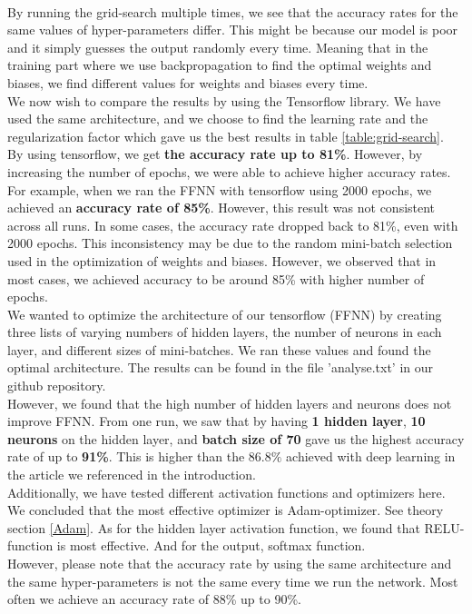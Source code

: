 \documentclass[reprint,english,notitlepage]{revtex4-1}  %
\begin{document}
\vspace{3mm}
\\
By running the grid-search multiple times, we see that the accuracy rates for the same values of hyper-parameters differ. This might be because our model is poor and it simply guesses the output randomly every time. Meaning that in the training part where we use backpropagation to find the optimal weights and biases, we find different values for weights and biases every time. 
\vspace{3mm}
\\
We now wish to compare the results by using the Tensorflow library. We have used the same architecture, and we choose to find the learning rate and the regularization factor which gave us the best results in table \ref{table:grid-search}. 
\vspace{3mm}
\\
By using tensorflow, we get \textbf{the accuracy rate up to 81\%}. However, by increasing the number of epochs, we were able to achieve higher accuracy rates. For example, when we ran the FFNN with tensorflow using 2000 epochs, we achieved an \textbf{accuracy rate of 85\%}. However, this result was not consistent across all runs. In some cases, the accuracy rate dropped back to 81\%, even with 2000 epochs. This inconsistency may be due to the random mini-batch selection used in the optimization of weights and biases. However, we observed that in most cases, we achieved accuracy to be around 85\% with higher number of epochs. 
\vspace{3mm}
\\
We wanted to optimize the architecture of our tensorflow (FFNN) by creating three lists of varying numbers of hidden layers, the number of neurons in each layer, and different sizes of mini-batches. We ran these values and found the optimal architecture. The results can be found in the file 'analyse.txt' in our github repository.
\vspace{3mm}
\\
However, we found that the high number of hidden layers and neurons does not improve FFNN. From one run, we saw that by having \textbf{1 hidden layer}, \textbf{10 neurons} on the hidden layer, and \textbf{batch size of 70} gave us the highest accuracy rate of up to \textbf{91\%}. This is higher than the $86.8\%$ achieved with deep learning in the article we referenced in the introduction.
\vspace{3mm}
\\
Additionally, we have tested different activation functions and optimizers here. We concluded that the most effective optimizer is Adam-optimizer. See theory section \ref{Adam}. As for the hidden layer activation function, we found that RELU-function is most effective. And for the output, softmax function.
\vspace{3mm}
\\
However, please note that the accuracy rate by using the same architecture and the same hyper-parameters is not the same every time we run the network. Most often we achieve an accuracy rate of 88\% up to 90\%. 
\end{document}
